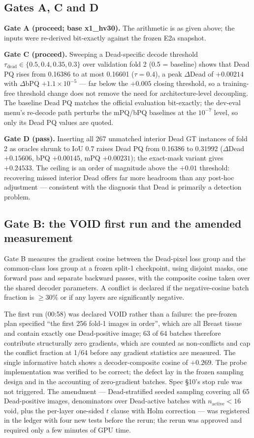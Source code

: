 \documentclass[11pt,a4paper]{article}
\begin{document}
\subsection{Gates A, C and D}

\textbf{Gate A (proceed; base x1\_hv30).} The arithmetic is as given above; the inputs were re-derived bit-exactly against the frozen E2a snapshot.

\textbf{Gate C (proceed).} Sweeping a Dead-specific decode threshold $\tau_{\mathrm{dead}}\in\{0.5,0.4,0.35,0.3\}$ over validation fold 2 (0.5 = baseline) shows that Dead PQ rises from 0.16386 to at most 0.16601 ($\tau=0.4$), a peak $\Delta$Dead of $+0.00214$ with $\Delta$bPQ $+1.1\times10^{-5}$ --- far below the $+0.005$ closing threshold, so a training-free threshold change does not remove the need for architecture-level decoupling. The baseline Dead PQ matches the official evaluation bit-exactly; the dev-eval menu's re-decode path perturbs the mPQ/bPQ baselines at the $10^{-7}$ level, so only its Dead PQ values are quoted.

\textbf{Gate D (pass).} Inserting all 267 unmatched interior Dead GT instances of fold 2 as oracles shrunk to IoU 0.7 raises Dead PQ from 0.16386 to 0.31992 ($\Delta$Dead $+0.15606$, bPQ $+0.00145$, mPQ $+0.00231$); the exact-mask variant gives $+0.24533$. The ceiling is an order of magnitude above the $+0.01$ threshold: recovering missed interior Dead offers far more headroom than any post-hoc adjustment --- consistent with the diagnosis that Dead is primarily a detection problem.

\subsection{Gate B: the VOID first run and the amended measurement}

Gate B measures the gradient cosine between the Dead-pixel loss group and the common-class loss group at a frozen split-1 checkpoint, using disjoint masks, one forward pass and separate backward passes, with the composite cosine taken over the shared decoder parameters. A conflict is declared if the negative-cosine batch fraction is $\geq$30\% or if any layers are significantly negative.

The first run (00:58) was declared VOID rather than a failure: the pre-frozen plan specified ``the first 256 fold-1 images in order'', which are all Breast tissue and contain exactly one Dead-positive image; 63 of 64 batches therefore contribute structurally zero gradients, which are counted as non-conflicts and cap the conflict fraction at 1/64 before any gradient statistics are measured. The single informative batch shows a decoder-composite cosine of $+0.269$. The probe implementation was verified to be correct; the defect lay in the frozen sampling design and in the accounting of zero-gradient batches. Spec \S10's stop rule was not triggered. The amendment --- Dead-stratified seeded sampling covering all 65 Dead-positive images, denominators over Dead-active batches with $n_{\mathrm{active}}<16$ void, plus the per-layer one-sided $t$ clause with Holm correction --- was registered in the ledger with four new tests before the rerun; the rerun was approved and required only a few minutes of GPU time.
\end{document}
